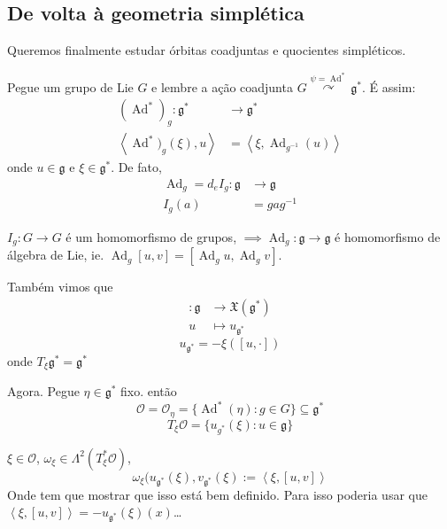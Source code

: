 \subsection{De volta à geometria simplética}

Queremos finalmente estudar órbitas coadjuntas e quocientes simpléticos.

Pegue um grupo de Lie $G$ e lembre a ação coadjunta $G\overset{\psi=\operatorname{Ad}^*}{ \curvearrowright }\mathfrak{g}^*$. É assim:
\begin{align*}
	(\operatorname{Ad}^*)_g: \mathfrak{g}^* &\longrightarrow \mathfrak{g}^* \\
	\left<\operatorname{Ad}^*)_g(\xi ),u\right>  &=\left<\xi,\operatorname{Ad}_{g^{-1}}(u)\right> 
\end{align*}
onde $u\in\mathfrak{g}$ e $\xi \in\mathfrak{g}^*$. De fato,
\begin{align*}
	\operatorname{Ad}_g=d_e I_g:\mathfrak{g} &\longrightarrow \mathfrak{g} \\
	I_g(a) &=gag^{-1}
\end{align*}

\begin{remark}
	$I_g:G\to G$ é um homomorfismo de grupos, $\implies \operatorname{Ad}_g:\mathfrak{g} \to \mathfrak{g}$ é homomorfismo de álgebra de Lie, ie. $\operatorname{Ad}_g[u,v]=[\operatorname{Ad}_gu,\operatorname{Ad}_gv]$.

	Também vimos que
	\begin{align*}
		: \mathfrak{g} &\longrightarrow \mathfrak{X}(\mathfrak{g}^*) \\
		u &\longmapsto u_{\mathfrak{g}^*}
	\end{align*}
	\[u_{\mathfrak{g}^*}=-\xi([u,\cdot ])\]
	onde $T_\xi \mathfrak{g}^*=\mathfrak{g}^*$
\end{remark}

Agora. Pegue $\eta\in\mathfrak{g}^*$ fixo. então
\[\mathcal{O}=\mathcal{O}_\eta=\{\operatorname{Ad}^*(\eta):g\in G\} \subseteq \mathfrak{g}^*\]
\[T_\xi \mathcal{O}=\{u_{g^*}(\xi ):u\in\mathfrak{g}\}\]

\begin{defn}
	$\xi \in\mathcal{O}$, $\omega_\xi \in\Lambda^{2}(T_\xi^*\mathcal{O})$,
	\[\omega_\xi(u_{\mathfrak{g}^*} (\xi ),v_{\mathfrak{g}^*}(\xi ):=\left<\xi,[u,v]\right> \]
	Onde tem que mostrar que isso está bem definido. Para isso poderia usar que $\left<\xi,[u,v]\right> =-u_{\mathfrak{g}^*}(\xi )(x)$…
\end{defn}

